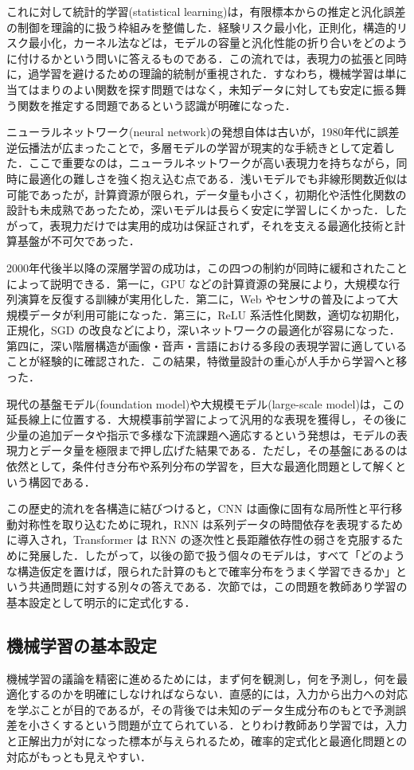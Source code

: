 これに対して統計的学習(statistical learning)\cite{Vapnik1998,Hastie2009}は，有限標本からの推定と汎化誤差の制御を理論的に扱う枠組みを整備した．経験リスク最小化，正則化，構造的リスク最小化，カーネル法などは，モデルの容量と汎化性能の折り合いをどのように付けるかという問いに答えるものである．この流れでは，表現力の拡張と同時に，過学習を避けるための理論的統制が重視された．すなわち，機械学習は単に当てはまりのよい関数を探す問題ではなく，未知データに対しても安定に振る舞う関数を推定する問題であるという認識が明確になった．

ニューラルネットワーク(neural network)の発想自体は古いが，1980年代に誤差逆伝播法が広まったことで，多層モデルの学習が現実的な手続きとして定着した．ここで重要なのは，ニューラルネットワークが高い表現力を持ちながら，同時に最適化の難しさを強く抱え込む点である．浅いモデルでも非線形関数近似は可能であったが，計算資源が限られ，データ量も小さく，初期化や活性化関数の設計も未成熟であったため，深いモデルは長らく安定に学習しにくかった．したがって，表現力だけでは実用的成功は保証されず，それを支える最適化技術と計算基盤が不可欠であった．

2000年代後半以降の深層学習の成功は，この四つの制約が同時に緩和されたことによって説明できる．第一に，GPU などの計算資源の発展により，大規模な行列演算を反復する訓練が実用化した．第二に，Web やセンサの普及によって大規模データが利用可能になった．第三に，ReLU 系活性化関数，適切な初期化，正規化，SGD の改良などにより，深いネットワークの最適化が容易になった．第四に，深い階層構造が画像・音声・言語における多段の表現学習に適していることが経験的に確認された．この結果，特徴量設計の重心が人手から学習へと移った．

現代の基盤モデル(foundation model)や大規模モデル(large-scale model)は，この延長線上に位置する．大規模事前学習によって汎用的な表現を獲得し，その後に少量の追加データや指示で多様な下流課題へ適応するという発想は，モデルの表現力とデータ量を極限まで押し広げた結果である．ただし，その基盤にあるのは依然として，条件付き分布や系列分布の学習を，巨大な最適化問題として解くという構図である．

この歴史的流れを各構造に結びつけると，CNN は画像に固有な局所性と平行移動対称性を取り込むために現れ，RNN は系列データの時間依存を表現するために導入され，Transformer は RNN の逐次性と長距離依存性の弱さを克服するために発展した．したがって，以後の節で扱う個々のモデルは，すべて「どのような構造仮定を置けば，限られた計算のもとで確率分布をうまく学習できるか」という共通問題に対する別々の答えである．次節では，この問題を教師あり学習の基本設定として明示的に定式化する．

\subsection{機械学習の基本設定}
機械学習の議論を精密に進めるためには，まず何を観測し，何を予測し，何を最適化するのかを明確にしなければならない．直感的には，入力から出力への対応を学ぶことが目的であるが，その背後では未知のデータ生成分布のもとで予測誤差を小さくするという問題が立てられている．とりわけ教師あり学習では，入力と正解出力が対になった標本が与えられるため，確率的定式化と最適化問題との対応がもっとも見えやすい．

